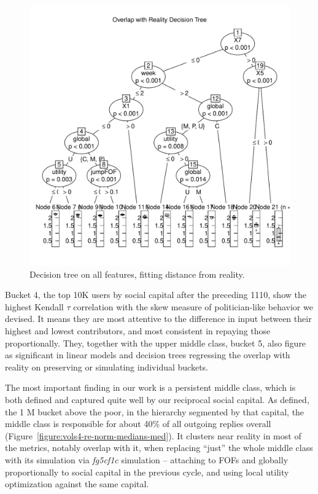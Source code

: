 \documentclass[10pt,oneside]{memoir}
\begin{document}
\begin{Spacing}{2}
\begin{figure}
\begin{center}
    \includegraphics{figures/decision-tree-overx-dreps}
    \caption{Decision tree on all features, fitting distance from reality.}
    \label{figure:decision-tree-overx-dreps}
\end{center}
\end{figure}
Bucket 4, the top 10K users by social capital after the preceding 1110, show the highest Kendall $\tau$ correlation with the skew measure of politician-like behavior we devised.  It means they are most attentive to the difference in input between their highest and lowest contributors, and most consistent in repaying those proportionally.  They, together with the upper middle class, bucket 5, also figure as significant in linear models and decision trees regressing the overlap with reality on preserving or simulating individual buckets.


The most important finding in our work is a persistent middle class, which is both defined and captured quite well by our reciprocal social capital.  As defined, the 1 M bucket above the poor, in the hierarchy segmented by that capital, the middle class is responsible for about 40\% of all outgoing replies overall (Figure~\ref{figure:vols4-re-norm-medians-med}).  It clusters near reality in most of the metrics, notably overlap with it, when replacing ``just'' the whole middle class with its simulation via {\itshape fg5cf1c} simulation -- attaching to FOFs and globally proportionally to social capital in the previous cycle, and using local utility optimization against the same capital.  



\end{Spacing}
\end{document}

